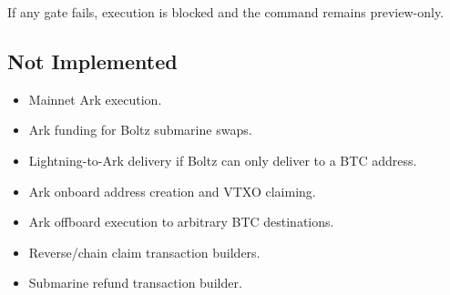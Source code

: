 \documentclass[
]{article}
\providecommand{\tightlist}{%
  \setlength{\itemsep}{0pt}\setlength{\parskip}{0pt}}
\begin{document}
If any gate fails, execution is blocked and the command remains
preview-only.

\hypertarget{not-implemented}{%
\subsection{Not Implemented}\label{not-implemented}}

\begin{itemize}
\tightlist
\item
  Mainnet Ark execution.
\item
  Ark funding for Boltz submarine swaps.
\item
  Lightning-to-Ark delivery if Boltz can only deliver to a BTC address.
\item
  Ark onboard address creation and VTXO claiming.
\item
  Ark offboard execution to arbitrary BTC destinations.
\item
  Reverse/chain claim transaction builders.
\item
  Submarine refund transaction builder.
\end{itemize}
\end{document}
